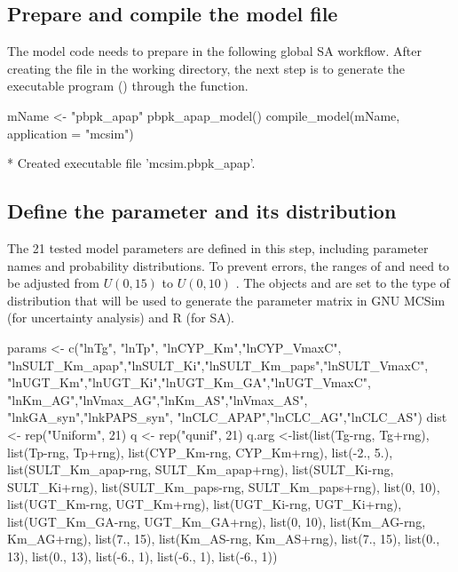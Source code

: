 \hypertarget{prepare-and-compile-the-model-file}{%
\subsection{Prepare and compile the model
file}\label{prepare-and-compile-the-model-file}}

The model code needs to prepare in the following global SA workflow.
After creating the  file in the working
directory, the next step is to generate the executable program
() through the  function.

\begin{Schunk}
\begin{Sinput}
mName <- "pbpk_apap"
pbpk_apap_model()
compile_model(mName, application = "mcsim")
\end{Sinput}
\begin{Soutput}
  * Created executable file 'mcsim.pbpk_apap'.
\end{Soutput}
\end{Schunk}

\hypertarget{define-the-parameter-and-its-distribution}{%
\subsection{Define the parameter and its
distribution}\label{define-the-parameter-and-its-distribution}}

The 21 tested model parameters are defined in this step, including
parameter names and probability distributions. To prevent errors, the
ranges of  and  need to be adjusted
from \(U(0, 15)\) \citep{s13318-015-0253-x} to \(U(0, 10)\)
\citep{fphar201800588}. The objects  and  are set to
the type of distribution that will be used to generate the parameter
matrix in GNU MCSim (for uncertainty analysis) and R (for SA).

\begin{Schunk}
\begin{Sinput}
params <- c("lnTg", "lnTp", "lnCYP_Km","lnCYP_VmaxC",
           "lnSULT_Km_apap","lnSULT_Ki","lnSULT_Km_paps","lnSULT_VmaxC",
           "lnUGT_Km","lnUGT_Ki","lnUGT_Km_GA","lnUGT_VmaxC",
           "lnKm_AG","lnVmax_AG","lnKm_AS","lnVmax_AS",
           "lnkGA_syn","lnkPAPS_syn", "lnCLC_APAP","lnCLC_AG","lnCLC_AS")
dist <- rep("Uniform", 21)
q <- rep("qunif", 21)
q.arg <-list(list(Tg-rng, Tg+rng), list(Tp-rng, Tp+rng), 
             list(CYP_Km-rng, CYP_Km+rng), list(-2., 5.),
             list(SULT_Km_apap-rng, SULT_Km_apap+rng),
             list(SULT_Ki-rng, SULT_Ki+rng),
             list(SULT_Km_paps-rng, SULT_Km_paps+rng),
             list(0, 10), list(UGT_Km-rng, UGT_Km+rng),
             list(UGT_Ki-rng, UGT_Ki+rng),
             list(UGT_Km_GA-rng, UGT_Km_GA+rng),
             list(0, 10), list(Km_AG-rng, Km_AG+rng),
             list(7., 15), list(Km_AS-rng, Km_AS+rng),
             list(7., 15), list(0., 13), list(0., 13),
             list(-6., 1), list(-6., 1), list(-6., 1))
\end{Sinput}
\end{Schunk}

